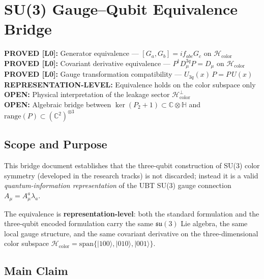 \documentclass[11pt,a4paper]{article}
\newcommand{\C}{\mathbb{C}}
\newcommand{\H}{\mathbb{H}}
\newcommand{\Lzero}{\textbf{[L0]}}
\begin{document}
\fi

\section{SU(3) Gauge–Qubit Equivalence Bridge}
\label{sec:bridges:su3_gauge_qubit}

\begin{tcolorbox}[colback=green!5!white,colframe=green!50!black,
  title=Equivalence Status Summary]
\textbf{PROVED \Lzero:} Generator equivalence —
  $[G_a, G_b] = if_{abc}G_c$ on $\mathcal{H}_{\mathrm{color}}$ \\
\textbf{PROVED \Lzero:} Covariant derivative equivalence —
  $P^\dagger D_\mu^{3q} P = D_\mu$ on $\mathcal{H}_{\mathrm{color}}$ \\
\textbf{PROVED \Lzero:} Gauge transformation compatibility —
  $U_{3q}(x)\,P = P\,U(x)$ \\
\textbf{REPRESENTATION-LEVEL:} Equivalence holds on the color subspace only \\
\textbf{OPEN:} Physical interpretation of the leakage sector $\mathcal{H}_{\mathrm{color}}^\perp$ \\
\textbf{OPEN:} Algebraic bridge between $\ker(P_2+1) \subset \C\otimes\H$ and
  $\mathrm{range}(P) \subset (\C^2)^{\otimes 3}$
\end{tcolorbox}

\subsection{Scope and Purpose}
\label{sec:bridges:su3_gauge_qubit:scope}

This bridge document establishes that the three-qubit construction of SU(3)
color symmetry (developed in the research tracks) is not discarded; instead it
is a valid \emph{quantum-information representation} of the UBT SU(3) gauge
connection $A_\mu = A_\mu^a \lambda_a$.

The equivalence is \textbf{representation-level}: both the standard formulation
and the three-qubit encoded formulation carry the same $\mathfrak{su}(3)$ Lie
algebra, the same local gauge structure, and the same covariant derivative
on the three-dimensional color subspace
$\mathcal{H}_{\mathrm{color}} = \mathrm{span}\{|100\rangle, |010\rangle,
|001\rangle\}$.

\subsection{Main Claim}
\label{sec:bridges:su3_gauge_qubit:main_claim}
\end{document}
